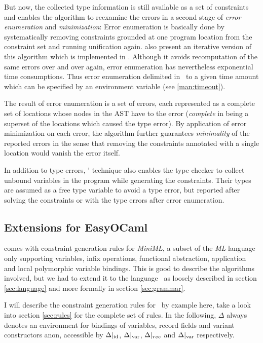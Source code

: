 But now, the collected type information is still available as a set of
constraints and enables the algorithm to reexamine the errors in a second stage
of \emph{error enumeration} and \emph{minimization}: Error enumeration is
basically done by systematically removing constraints grounded at one program
location from the constraint set and running unification again.
\citet{haackwells04} also present an iterative version of this algorithm which
is implemented in \easyocaml. Although it avoids recomputation of the same
errors over and over again, error enumeration has nevertheless exponential time
consumptions. Thus error enumeration delimited in \easyocaml\ to a given time
amount which can be specified by an environment variable (see
\ref{man:timeout}).

The result of error enumeration is a set of errors, each represented as a
complete set of locations whose nodes in the AST have to the error
(\emph{complete} in being a superset of the locations which caused the type
error). By application of error minimization on each error, the algorithm
further guarantees \emph{minimality} of the reported errors in the sense that
removing the constraints annotated with a single location would vanish the error
itself.

In addition to type errors, \citeauthor{haackwells04}' technique also enables the 
type checker to collect unbound variables in the program while generating the
constraints.
Their types are assumed as a free type variable to avoid a type error, but
reported after solving the constraints or with the type errors after error
enumeration.


\subsection{Extensions for EasyOCaml}
\label{sec:extending}

\citet{haackwells04} comes with constraint generation rules for
\textsl{MiniML}, a subset of the \textsl{ML} language only supporting
variables, infix operations, functional abstraction, application and local
polymorphic variable bindings.
This is good to describe the algorithms involved, but we had to extend it to
the language \camlm\ as loosely described in section \ref{sec:language} and more
formally in section \ref{sec:grammar}.

I will describe the constraint generation rules for \easyocaml\ by example
here, take a look into section \ref{sec:rules} for the complete set of rules.
In the following, $\Delta$ always denotes an environment for bindings of
variables, record fields and variant constructors anon, accessible by
$\Delta|_{\text{id}}$, $\Delta|_{\text{var}}$, $\Delta|_{rec}$ and $\Delta|_{\text{var}}$
respectively.

